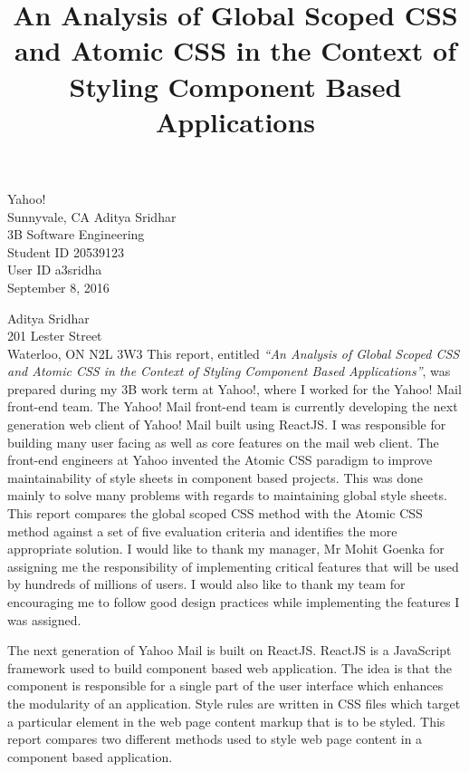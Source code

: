 \documentclass[12pt]{article}
\begin{document}
\title{An Analysis of Global Scoped CSS and Atomic CSS in the Context of Styling Component Based Applications}
{
	Yahoo!\\
	Sunnyvale, CA
}
{
	Aditya Sridhar\\
	3B Software Engineering\\
	Student ID 20539123\\
	User ID a3sridha\\
	September 8, 2016
}


{
	\noindent
	Aditya Sridhar\\
	201 Lester Street\\
	Waterloo, ON N2L 3W3
}
{
	\noindent
	This report, entitled \textit{“An Analysis of Global Scoped CSS and Atomic CSS in the Context of Styling Component Based Applications”}, was prepared during my 3B work term at Yahoo!, where I worked for the Yahoo! Mail front-end team.
}
{
	\noindent
	The Yahoo! Mail front-end team is currently developing the next generation web client of Yahoo! Mail built using ReactJS. I was responsible for building many user facing as well as core features on the mail web client.
}
{
	\noindent
	The front-end engineers at Yahoo invented the Atomic CSS paradigm to improve maintainability of style sheets in component based projects. This was done mainly to solve many problems with regards to maintaining global style sheets. This report compares the global scoped CSS method with the Atomic CSS method against a set of five evaluation criteria and identifies the more appropriate solution.
}
{
	\noindent
	I would like to thank my manager, Mr Mohit Goenka for assigning me the responsibility of implementing critical features that will be used by hundreds of millions of users. I would also like to thank my team for encouraging me to follow good design practices while implementing the features I was assigned.
}



The next generation of Yahoo Mail is built on ReactJS. ReactJS is a JavaScript framework used to build component based web application. The idea is that the component is responsible for a single part of the user interface which enhances the modularity of an application. Style rules are written in CSS files which target a particular element in the web page content markup that is to be styled. This report compares two different methods used to style web page content in a component based application.
\end{document}
